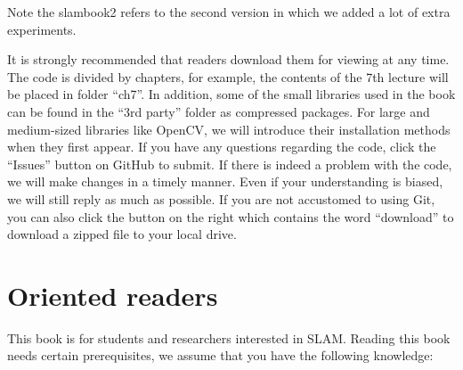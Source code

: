 Note the slambook2 refers to the second version in which we added a lot of extra experiments.


It is strongly recommended that readers download them for viewing at any time. The code is divided by chapters, for example, the contents of the 7th lecture will be placed in folder ``ch7''. In addition, some of the small libraries used in the book can be found in the ``3rd party'' folder as compressed packages. For large and medium-sized libraries like OpenCV, we will introduce their installation methods when they first appear. If you have any questions regarding the code, click the ``Issues'' button on GitHub to submit. If there is indeed a problem with the code, we will make changes in a timely manner. Even if your understanding is biased, we will still reply as much as possible. If you are not accustomed to using Git, you can also click the button on the right which contains the word ``download'' to download a zipped file to your local drive.

\section{Oriented readers}

This book is for students and researchers interested in SLAM. Reading this book needs certain prerequisites, we assume that you have the following knowledge:

